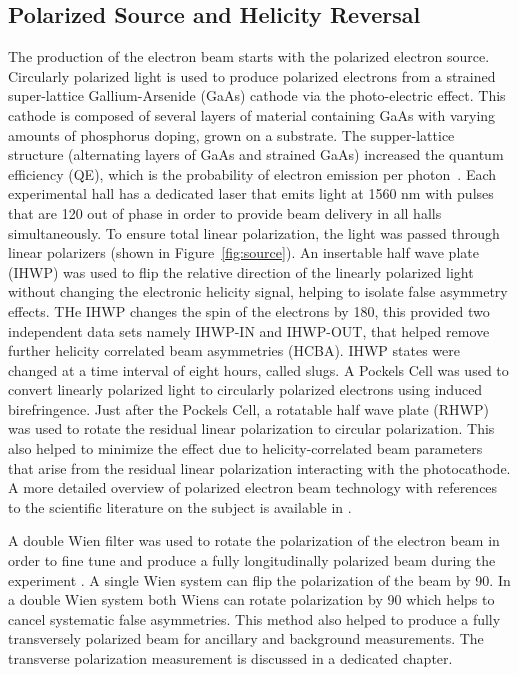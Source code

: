 \subsection{Polarized Source and Helicity Reversal}%
\label{Polarized Source and Helicity Reversal}

The production of the electron beam starts with the polarized electron source. Circularly polarized light is used to produce polarized electrons from a strained super-lattice Gallium-Arsenide (GaAs) cathode via the photo-electric effect. This cathode is composed of several layers of material containing GaAs with varying amounts of phosphorus doping, grown on a substrate. 
The supper-lattice structure (alternating layers of GaAs and strained GaAs) increased the quantum efficiency (QE), which is the probability of electron emission per photon~\cite{presentation:poelker_source_1436}.
Each experimental hall has a dedicated laser that emits light at 1560 nm with pulses that are 120\degrees{} out of phase in order to provide beam delivery in all halls simultaneously. To ensure total linear polarization,  the light was passed through linear polarizers (shown in Figure~\ref{fig:source}). 
An insertable half wave plate (IHWP) was used to flip the relative direction of the linearly polarized light without changing the electronic helicity signal, helping to isolate false asymmetry effects. THe IHWP changes the spin of the electrons by 180\degrees{}, this provided two independent data sets namely IHWP-IN and IHWP-OUT, that helped remove further helicity correlated beam asymmetries (HCBA). IHWP states were changed at a time interval of eight hours, called slugs. A Pockels Cell was used to convert linearly polarized light to circularly polarized electrons using induced birefringence. Just after the Pockels Cell, a rotatable half wave plate (RHWP) was used to rotate the residual linear polarization to circular polarization. This also helped to minimize the effect due to helicity-correlated beam parameters that arise from the residual linear polarization interacting with the photocathode.
A more detailed overview of polarized electron beam technology with references to the scientific literature on the subject is available in \cite{jlab_source_book}.

A double Wien filter was used to rotate the polarization of the electron beam in order to fine tune and produce a fully longitudinally polarized beam during the experiment \cite{grames_double_wien_proceedings}. A single Wien system can flip the polarization of the beam by 90\degrees{}. In a double Wien system both Wiens can rotate polarization by 90\degrees{} which helps to cancel systematic false asymmetries. This method also helped to produce a fully transversely polarized beam for ancillary and background measurements.  The transverse polarization measurement is discussed in a dedicated chapter.


